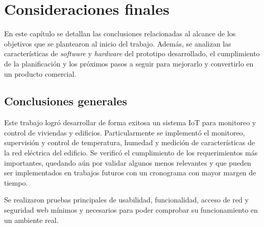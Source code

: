 
\chapter{Consideraciones finales} %

\label{Chapter5} %

En este capítulo se detallan las conclusiones relacionadas al alcance de los objetivos que se plantearon al inicio del trabajo. Además, se analizan las características de \emph{software} y \emph{hardware} del prototipo desarrollado, el cumplimiento de la planificación y los próximos pasos a seguir para mejorarlo y convertirlo en un producto comercial.




\section{Conclusiones generales }

Este trabajo logró desarrollar de forma exitosa un sistema IoT para monitoreo y control de viviendas y edificios. Particularmente se implementó el monitoreo, supervisión y control de temperatura, humedad y medición de características de la red eléctrica del edificio. Se verificó el cumplimiento de los requerimientos más importantes, quedando aún por validar algunos menos relevantes y que pueden ser implementados en trabajos futuros con un cronograma con mayor margen de tiempo.





Se realizaron pruebas principales de usabilidad, funcionalidad, acceso de red y seguridad web mínimos y necesarios para poder comprobar su funcionamiento en un ambiente real. 


